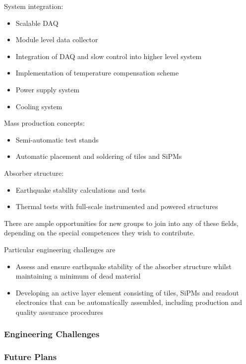 System integration:
\begin{itemize}
\item Scalable DAQ
\item Module level data collector
\item Integration of DAQ and slow control into higher level system
\item Implementation of temperature compensation scheme
\item Power supply system
\item Cooling system
\end{itemize}

Mass production concepts:
\begin{itemize}
\item Semi-automatic test stands
\item Automatic placement and soldering of tiles and SiPMs
\end{itemize}

Absorber structure:
\begin{itemize}
\item Earthquake stability calculations and tests
\item Thermal tests with full-scale instrumented and powered structures  
\end{itemize}

There are ample opportunities for new groups to join into any of these fields, depending on the special competences they wish to contribute. 

Particular engineering challenges are
\begin{itemize}
\item Assess and ensure earthquake stability of the absorber structure whilst maintaining a minimum of dead material
\item Developing an active layer element consisting of tiles, SiPMs and readout electronics that can be automatically assembled, including production and quality assurance procedures
\end{itemize}

\subsubsection{Engineering Challenges}
\subsubsection{Future Plans}